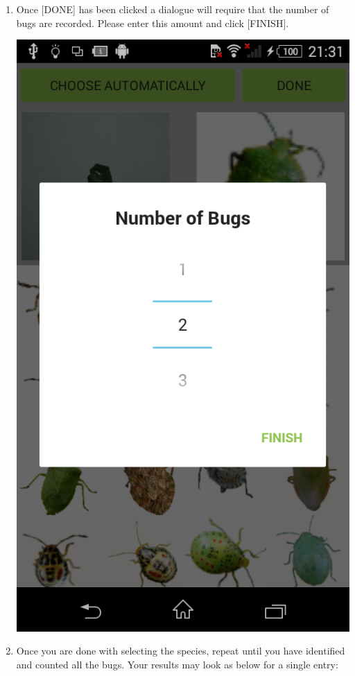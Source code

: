 \documentclass[11pt,a4paper,titlepage]{article}
\begin{document}
\begin{enumerate}
\item Once [DONE] has been clicked a dialogue will require that the number of bugs are recorded. Please enter this amount and click [FINISH].
\begin{center}
				\includegraphics[scale=0.3]{identifychoosenumber}
			\end{center}

\item Once you are done with selecting the species, repeat until you have identified and counted all the bugs. Your results may look as below for a single entry:


\end{enumerate}
\end{document}
